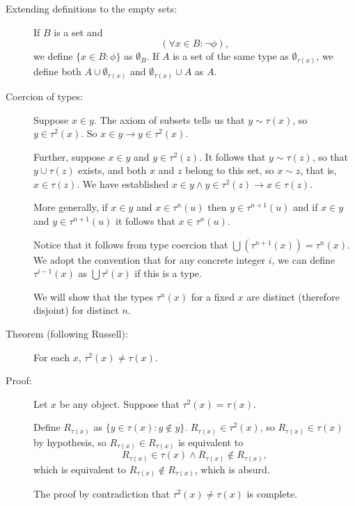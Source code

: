 \documentclass[12pt]{article}
\begin{document}
\begin{description}

\item[Extending definitions to the empty sets:]  If $B$ is a set and $$(\forall x \in B:\neg \phi),$$ we define $\{x \in B:\phi\}$ as $\emptyset_{B}$.  If $A$ is a set of the same type as  $\emptyset_{\tau(x)}$, we define both $A \cup  \emptyset_{\tau(x)}$ and  $\emptyset_{\tau(x)}\cup A$ as $A$.



\item[Coercion of types:]  Suppose $x \in y$.   The axiom of subsets tells us that $y \sim \tau(x)$, so $y \in \tau^2(x)$. 
So $x \in y \rightarrow y \in \tau^2(x)$.

Further, suppose $x \in y$ and $y \in \tau^2(z)$.  It follows that $y \sim \tau(z)$, so  that  $y \cup \tau(z)$ exists, and both $x$ and $z$ belong to this set, so $x \sim z$, that is,
$x \in \tau(z)$.  We have established $x \in y \wedge y \in \tau^2(z) \rightarrow x \in \tau(z)$.

More generally, if $x \in y$ and $x \in \tau^n(u)$ then $y \in \tau^{n+1}(u)$ and if $x \in y$ and $y \in \tau^{n+1}(u)$ it follows
that $x \in \tau^n(u)$. 

Notice that it follows from type coercion that $\bigcup(\tau^{n+1}(x)) = \tau^n(x)$.  We adopt the convention that for any concrete integer $i$, we can define $\tau^{i-1}(x)$ as $\bigcup \tau^i(x)$ if this is a type.

We will show that the types $\tau^n(x)$ for a fixed $x$ are distinct (therefore disjoint) for distinct $n$.



\item[Theorem (following Russell):]  For each $x$, $\tau^2(x) \neq \tau(x)$.

\item[Proof:]  Let $x$ be any object.  Suppose that $\tau^2(x)=\tau(x)$. 

Define $R_{\tau(x)}$ as $\{y \in \tau(x):y \not\in y\}$.  $R_{\tau(x)} \in \tau^2(x)$, so $R_{\tau(x)} \in \tau(x)$ by hypothesis, so $R_{\tau(x)} \in R_{\tau(x)}$ is equivalent to $$R_{\tau(x)} \in \tau(x) \wedge R_{\tau(x)} \not\in R_{\tau(x)},$$ which is equivalent to $R_{\tau(x)} \not\in R_{\tau(x)}$, which is absurd.

The proof by contradiction that $\tau^2(x)\neq \tau(x)$ is complete.

\end{description}
\end{document}
